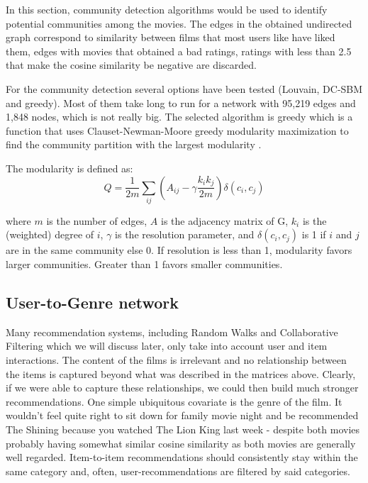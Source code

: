 \documentclass[12pt]{article}
\numberwithin{equation}{section}
\begin{document}
In this section, community detection algorithms would be used to identify potential communities among the movies. The edges in the obtained undirected graph correspond to similarity between films that most users like have liked them, edges with movies that obtained a bad ratings, ratings with less than 2.5 that make the cosine similarity be negative are discarded. 

For the community detection several options have been tested (Louvain, DC-SBM and greedy). Most of them take long to run for a network with 95,219 edges and 1,848 nodes, which is not really big. The selected algorithm is greedy which is a function that uses Clauset-Newman-Moore greedy modularity maximization to find the community partition with the largest modularity \cite{}.

The modularity is defined as: 
\begin{equation}
Q = \frac{1}{2m} \sum_{ij} ( A_{ij} - \gamma \frac{k_i k_j}{2m}) \delta (c_i, c_j)
\end{equation}

where $m$ is the number of edges, $A$ is the adjacency matrix of G, $k_i$ is the (weighted) degree of $i$, $\gamma$ is the resolution parameter, and $\delta (c_i, c_j)$ is 1 if $i$ and $j$ are in the same community else 0. If resolution is less than 1, modularity favors larger communities. Greater than 1 favors smaller communities.

\newpage

\subsection{User-to-Genre network}

Many recommendation systems, including Random Walks and Collaborative Filtering which we will discuss later, only take into account user and item interactions. The content of the films is irrelevant and no relationship between the items is captured beyond what was described in the matrices above. Clearly, if we were able to capture these relationships, we could then build much stronger recommendations. One simple ubiquitous covariate is the genre of the film. It wouldn't feel quite right to sit down for family movie night and be recommended The Shining because you watched The Lion King last week - despite both movies probably having somewhat similar cosine similarity as both movies are generally well regarded. Item-to-item recommendations should consistently stay within the same category and, often, user-recommendations are filtered by said categories.
\end{document}
